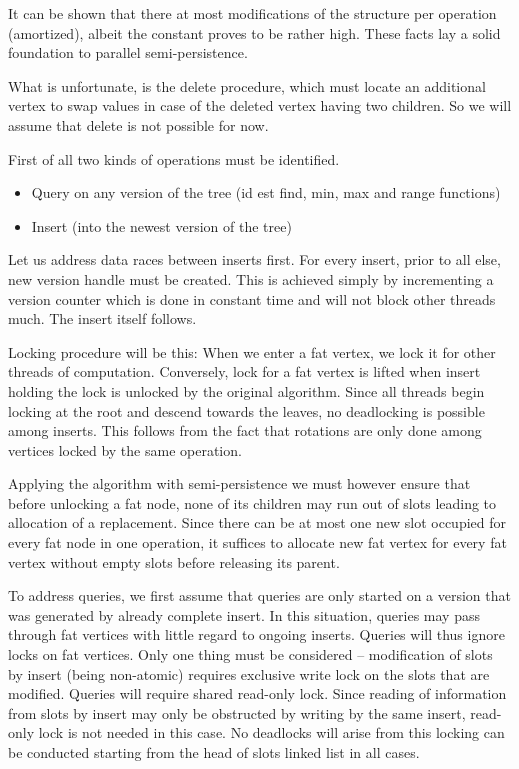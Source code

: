 It can be shown that there at most  modifications of the structure per operation (amortized), albeit the constant proves to be rather high. These facts lay a solid foundation to parallel semi-persistence.

What is unfortunate, is the delete procedure, which must locate an additional vertex to swap values in case of the deleted vertex having two children. So we will assume that delete is not possible for now.

First of all two kinds of operations must be identified. 

\begin{itemize}
	\item Query on any version of the tree (id est find, min, max and range functions)
	\item Insert (into the newest version of the tree)
\end{itemize}

Let us address data races between inserts first. For every insert, prior to all else, new version handle must be created. This is achieved simply by incrementing a version counter which is done in constant time and will not block other threads much. The insert itself follows.

Locking procedure will be this: When we enter a fat vertex, we lock it for other threads of computation. Conversely, lock for a fat vertex is lifted when insert holding the lock  is unlocked by the original algorithm. Since all threads begin locking at the root and descend towards the leaves, no deadlocking is possible among inserts. This follows from the fact that rotations are only done among vertices locked by the same operation.

Applying the algorithm with semi-persistence we must however ensure that before unlocking a fat node, none of its children may run out of slots leading to allocation of a replacement. Since there can be at most one new slot occupied for every fat node in one operation, it suffices to allocate new fat vertex for every fat vertex without empty slots before releasing its parent.

To address queries, we first assume that queries are only started on a version that was generated by already complete insert. In this situation, queries may pass through fat vertices with little regard to ongoing inserts. Queries will thus ignore locks on fat vertices. Only one thing must be considered -- modification of slots by insert (being non-atomic) requires exclusive write lock on the slots that are modified. Queries will require shared read-only lock. Since reading of information from slots by insert may only be obstructed by writing by the same insert, read-only lock is not needed in this case. No deadlocks will arise from this locking can be conducted starting from the head of slots linked list in all cases. 

